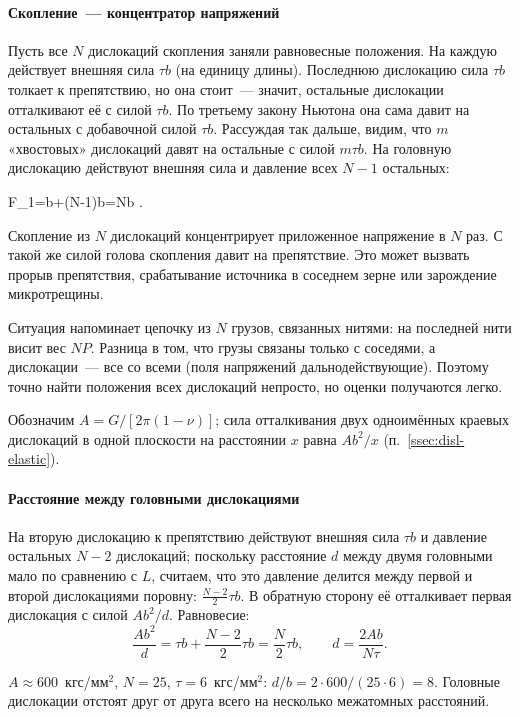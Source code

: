 \paragraph{Скопление~— концентратор напряжений}
Пусть все $N$ дислокаций скопления заняли равновесные положения. На
каждую действует внешняя сила $\tau b$ (на единицу длины). Последнюю
дислокацию сила $\tau b$ толкает к препятствию, но она стоит~— значит,
остальные дислокации отталкивают её с силой $\tau b$. По третьему закону
Ньютона она сама давит на остальных с добавочной силой $\tau b$.
Рассуждая так дальше, видим, что $m$ «хвостовых» дислокаций давят на
остальные с силой $m\tau b$. На головную дислокацию действуют внешняя
сила и давление всех $N-1$ остальных:
\begin{keyeq}\label{eq:pileup-head}
F_1=\tau b+(N-1)\tau b=N\tau b .
\end{keyeq}
\begin{glavnoe}
Скопление из $N$ дислокаций концентрирует приложенное напряжение в $N$
раз. С такой же силой голова скопления давит на препятствие. Это может
вызвать прорыв препятствия, срабатывание источника в соседнем зерне или
зарождение микротрещины.
\end{glavnoe}

Ситуация напоминает цепочку из $N$ грузов, связанных нитями: на последней
нити висит вес $NP$. Разница в том, что грузы связаны только с соседями,
а дислокации~— все со всеми (поля напряжений дальнодействующие).
Поэтому точно найти положения всех дислокаций непросто, но оценки
получаются легко.

Обозначим $A=G/[2\pi(1-\nu)]$; сила отталкивания двух одноимённых краевых
дислокаций в одной плоскости на расстоянии $x$ равна $Ab^2/x$
(п.~\ref{ssec:disl-elastic}).

\paragraph{Расстояние между головными дислокациями}
На вторую дислокацию к препятствию действуют внешняя сила $\tau b$ и
давление остальных $N-2$ дислокаций; поскольку расстояние $d$ между двумя
головными мало по сравнению с $L$, считаем, что это давление делится
между первой и второй дислокациями поровну: $\frac{N-2}{2}\tau b$. В
обратную сторону её отталкивает первая дислокация с силой $Ab^2/d$.
Равновесие:
\[
\frac{Ab^2}{d}=\tau b+\frac{N-2}{2}\tau b=\frac N2\tau b,\qquad
d=\frac{2Ab}{N\tau} .
\]

\begin{primer}
$A\approx600$~кгс/мм$^2$, $N=25$, $\tau=6$~кгс/мм$^2$:
$d/b=2\cdot600/(25\cdot6)=8$. Головные дислокации отстоят друг от друга
всего на несколько межатомных расстояний.
\end{primer}

